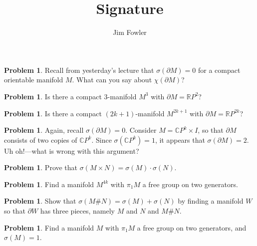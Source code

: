 \documentclass[12pt]{handout}
\title{Signature}
\author{Jim Fowler}
\theoremstyle{definition}
\newtheorem{problem}[theorem]{Problem}
\newcommand{\CP}{\mathbb{C}P}
\newcommand{\RP}{\mathbb{R}P}
\begin{document}
\maketitle

\begin{problem}
  Recall from yesterday's lecture that $\sigma(\partial M) = 0$ for a
  compact orientable manifold $M$.  What can you say about
  $\chi(\partial M)$?
\end{problem}

\vfill

\begin{problem}
  Is there a compact $3$-manifold $M^3$ with $\partial M
  = \RP^2$?
\end{problem}

\vfill

\begin{problem}
  Is there a compact $(2k+1)$-manifold $M^{2k+1}$ with $\partial M
  = \RP^{2k}$?
\end{problem}

\vfill

\begin{problem}
  Again, recall $\sigma(\partial M) = 0$.  Consider $M = \CP^k \times
  I$, so that $\partial M$ consists of two copies of $\CP^k$.  Since
  $\sigma(\CP^k) = 1$, it appears that $\sigma(\partial M) = 2$.  Uh
  oh!---what is wrong with this argument?
\end{problem}

\vfill

\begin{problem}
  Prove that $\sigma(M \times N) = \sigma(M) \cdot \sigma(N)$.
\end{problem}

\vfill

\begin{problem}
  Find a manifold $M^{4k}$ with $\pi_1 M$ a free group on two
  generators.
\end{problem}

\vfill

\begin{problem}
  Show that $\sigma(M \# N) = \sigma(M) + \sigma(N)$ by finding a
  manifold $W$ so that $\partial W$ has three pieces, namely $M$ and
  $N$ and $M \# N$.
\end{problem}

\vfill

\begin{problem}
  Find a manifold $M$ with $\pi_1 M$ a free group on two generators,
  and $\sigma(M) = 1$.
\end{problem}
\end{document}
